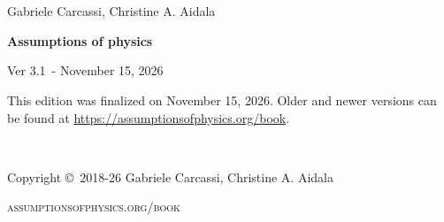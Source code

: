 \documentclass[11pt,letterpaper,fleqn]{memoir} %
\newif\ifdraft
\newcommand{\bookversion}{3.1}
\newcommand{\bookdate}{November 15, 2026}
\begin{document}
	





\frontmatter
\thispagestyle{empty} %

\newpage
\thispagestyle{empty}
~
\newpage

~
\thispagestyle{empty}

\vspace{20pt}

{\large \noindent Gabriele Carcassi, Christine A. Aidala }

\vspace{60pt}

{\Huge \noindent \textbf{Assumptions of physics}}

\vspace{30pt}

\ifdraft {\large \noindent Working DRAFT for Ver \bookversion  ~- \today}
\else {\large \noindent Ver \bookversion  ~- \bookdate}
\fi

\vfill


\ifdraft 
\noindent \textbf{This book is a work in progress}. This draft is a development copy built on \today. It is provided as-is for the purpose of early review and feedback. You can get the latest draft from \url{https://assumptionsofphysics.org/book}. 
\else
\noindent This edition was finalized on \bookdate. Older and newer versions can be found at  \url{https://assumptionsofphysics.org/book}.
\fi

\newpage
~\vfill
\thispagestyle{empty}

\noindent Copyright \copyright\ 2018-26 Gabriele Carcassi, Christine A. Aidala

\vspace{12pt}

\noindent \textsc{assumptionsofphysics.org/book}
\end{document}
